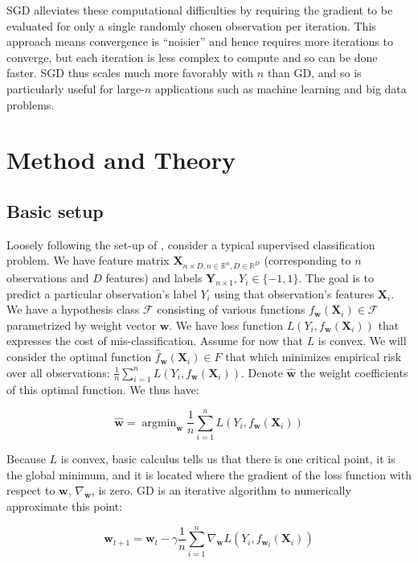 \documentclass{article}
\DeclareMathOperator*{\argmin}{argmin}
\begin{document}
SGD alleviates these computational difficulties by requiring the gradient to be
evaluated for only a single randomly chosen observation per iteration. This
approach means convergence is ``noisier'' and hence requires more iterations to
converge, but each iteration is less complex to compute and so can be done
faster. SGD thus scales much more favorably with $n$ than GD, and so is
particularly useful for large-$n$ applications such as machine learning
and big data problems.

\section{Method and Theory}

\subsection{Basic setup}

Loosely following the set-up of \cite{bottou2010large}, consider a typical supervised classification problem. We have
feature matrix $\bm{X}_{n \times D, n \in \mathbb{R}^n, D \in \mathbb{R}^D}$ (corresponding to $n$ observations and $D$
features) and labels $\bm{Y}_{n \times 1}, Y_i \in \{-1, 1\}$. The goal is to
predict a particular observation's label $Y_i$ using that observation's features $\bm{X}_i$. 
We have a hypothesis class $\mathcal{F}$ consisting of
various functions $f_{\bm{w}}(\bm{X}_i) \in \mathcal{F}$ parametrized by weight
vector $\bm{w}$. We have loss function $L(Y_i, f_{\bm{w}}(\bm{X}_i))$ that
expresses the cost of mis-classification. Assume for now that $L$ is convex. 
We will consider the optimal function $\hat{f}_{\bm{w}}(\bm{X}_i) \in F$ 
that which minimizes empirical risk over all observations: $\frac{1}{n}
\sum_{i=1}^n L(Y_i, f_{\bm{w}}(\bm{X}_i))$.
Denote $\hat{\bm{w}}$ the weight coefficients of this optimal function. We thus
have:

\begin{equation}
	\hat{\bm{w}} = \argmin_{\bm{w}}\frac{1}{n} \sum_{i=1}^n L(Y_i, f_{\bm{w}}(\bm{X}_i))
\end{equation}

Because $L$ is convex, basic calculus tells us that there is one critical point,
it is the global minimum, and it is located where the gradient of the loss
function with respect to $\bm{w}$, $\nabla_{\bm{w}}$, is zero. GD is an iterative
algorithm to numerically approximate this point:

\begin{equation}
	\bm{w}_{t+1} = \bm{w}_t - \gamma \frac{1}{n}\sum_{i=1}^n
	\nabla_{\bm{w}}L(Y_i, f_{\bm{w}_t}(\bm{X}_i))
\end{equation}
\end{document}
